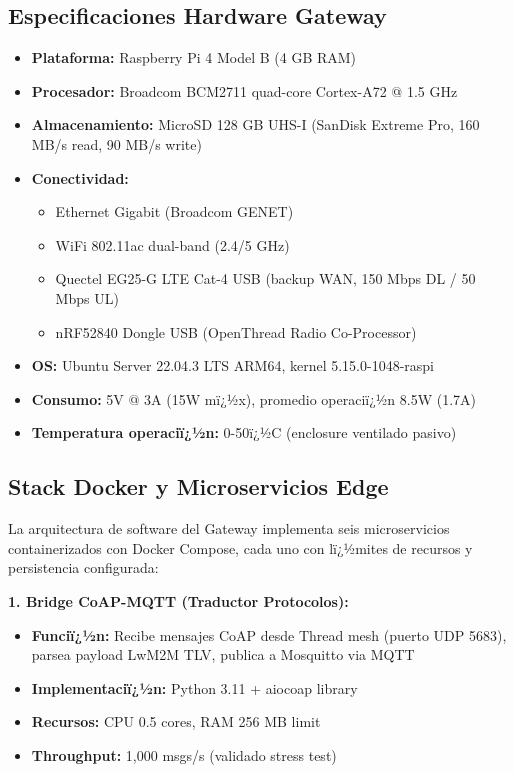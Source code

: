 \subsection{Especificaciones Hardware Gateway}\n\label{sec:impl-gateway-hw}\n\n\begin{itemize}\n    \item \textbf{Plataforma:} Raspberry Pi 4 Model B (4 GB RAM)\n    \item \textbf{Procesador:} Broadcom BCM2711 quad-core Cortex-A72 @ 1.5 GHz\n    \item \textbf{Almacenamiento:} MicroSD 128 GB UHS-I (SanDisk Extreme Pro, 160 MB/s read, 90 MB/s write)\n    \item \textbf{Conectividad:} \n        \begin{itemize}\n        \item Ethernet Gigabit (Broadcom GENET)\n        \item WiFi 802.11ac dual-band (2.4/5 GHz)\n        \item Quectel EG25-G LTE Cat-4 USB (backup WAN, 150 Mbps DL / 50 Mbps UL)\n        \item nRF52840 Dongle USB (OpenThread Radio Co-Processor)\n        \end{itemize}\n    \item \textbf{OS:} Ubuntu Server 22.04.3 LTS ARM64, kernel 5.15.0-1048-raspi\n    \item \textbf{Consumo:} 5V @ 3A (15W mï¿½x), promedio operaciï¿½n 8.5W (1.7A)\n    \item \textbf{Temperatura operaciï¿½n:} 0-50ï¿½C (enclosure ventilado pasivo)\n\end{itemize}\n\n\subsection{Stack Docker y Microservicios Edge}\n\label{sec:impl-software-gateway}

La arquitectura de software del Gateway implementa seis microservicios containerizados con Docker Compose, cada uno con lï¿½mites de recursos y persistencia configurada:

\textbf{1. Bridge CoAP-MQTT (Traductor Protocolos):}
\begin{itemize}
    \item \textbf{Funciï¿½n:} Recibe mensajes CoAP desde Thread mesh (puerto UDP 5683), parsea payload LwM2M TLV, publica a Mosquitto via MQTT
    \item \textbf{Implementaciï¿½n:} Python 3.11 + aiocoap library
    \item \textbf{Recursos:} CPU 0.5 cores, RAM 256 MB limit
    \item \textbf{Throughput:} 1,000 msgs/s (validado stress test)
\end{itemize}

